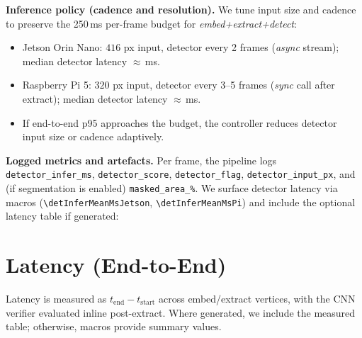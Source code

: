 \textbf{Inference policy (cadence and resolution).}
We tune input size and cadence to preserve the 250\,ms per-frame budget for \emph{embed+extract+detect}:
\begin{itemize}
  \item Jetson Orin Nano: \(416\) px input, detector every 2 frames (\emph{async} stream); median detector latency \(\approx\)\detInferMeanMsJetson\,ms.
  \item Raspberry Pi 5: \(320\) px input, detector every 3–5 frames (\emph{sync} call after extract); median detector latency \(\approx\)\detInferMeanMsPi\,ms.
  \item If end-to-end p95 approaches the budget, the controller reduces detector input size or cadence adaptively.
\end{itemize}

\textbf{Logged metrics and artefacts.}
Per frame, the pipeline logs \texttt{detector\_infer\_ms}, \texttt{detector\_score}, \texttt{detector\_flag}, \texttt{detector\_input\_px}, and (if segmentation is enabled) \texttt{masked\_area\_\%}. We surface detector latency via macros (\verb+\detInferMeanMsJetson+, \verb+\detInferMeanMsPi+) and include the optional latency table if generated:


\section{Latency (End-to-End)}
\label{sec:validation:latency}

Latency is measured as \(t_{\text{end}}-t_{\text{start}}\) across embed/extract vertices, with the CNN verifier evaluated inline post-extract. Where generated, we include the measured table; otherwise, macros provide summary values.


